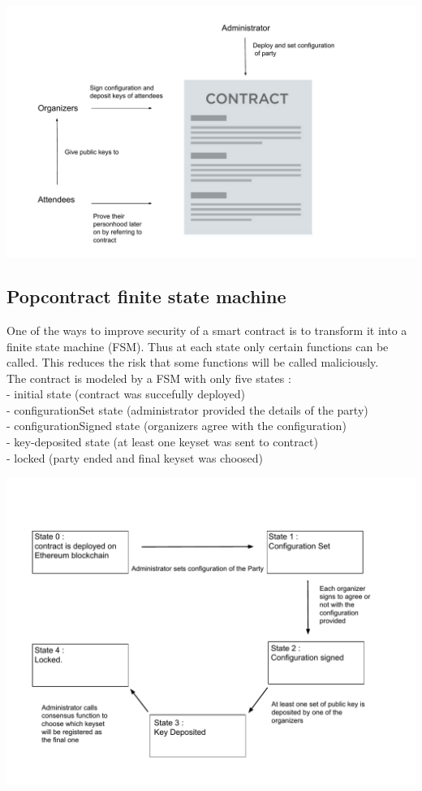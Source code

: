 \documentclass[11pt, a4paper, twoside, openright]{book} %
\begin{document}
\begin{minipage}{1\linewidth}
 \includegraphics[scale = 0.67]{popcontract.pdf}
\end{minipage}%

\subsection{Popcontract finite state machine}
One of the ways to improve security of a smart contract is to transform it into a finite state machine (FSM). Thus at each state only certain functions can be called. This reduces the risk that some functions will be called maliciously.\\ The contract is modeled by a FSM with only five states : \\- initial state (contract was succefully deployed)\\ - configurationSet state (administrator provided the details of the party) \\ - configurationSigned state (organizers agree with the configuration) \\ - key-deposited state (at least one keyset was sent to contract)\\ - locked (party ended and final keyset was choosed)

\begin{minipage}{1\linewidth}
 \includegraphics[scale = 0.67]{fsm.pdf}
\end{minipage}%
\end{document}
